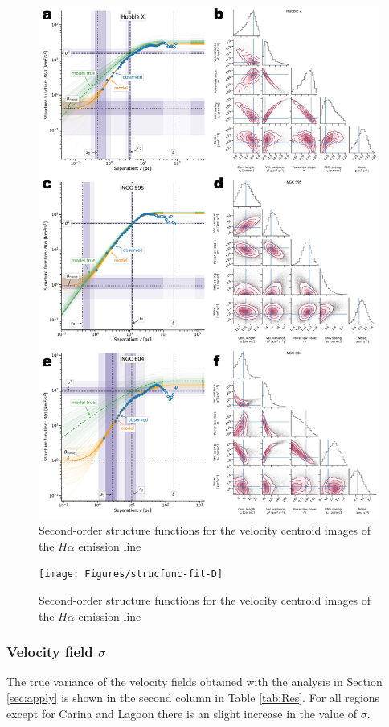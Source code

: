 \documentclass[fleqn,usenatbib, useAMS, a4paper]{mnras}
\begin{document}
\begin{figure}
  \centering
  \includegraphics[width=0.8\linewidth]{Figures/strucfunc-fit-C}
  \caption{Second-order structure functions for the velocity centroid images of the \(H\alpha\) emission line}\label{fig:strucfunc-fit-C}
\end{figure}

\begin{figure}
  \centering
  \texttt{[image: Figures/strucfunc-fit-D]}
  \caption{Second-order structure functions for the velocity centroid images of the \(H\alpha\) emission line}\label{fig:strucfunc-fit-D}
\end{figure}



\subsubsection{Velocity field \(\sigma\)}

The true variance of the velocity fields obtained with the analysis in Section \ref{sec:apply} is shown in the second column in Table \ref{tab:Res}. 
For all regions except for Carina and Lagoon there is an slight increase in the value of $\sigma$.
\end{document}

